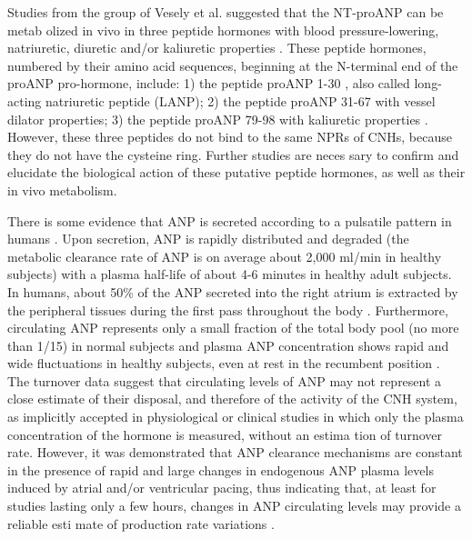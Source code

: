 \documentclass[14pt,a4paper,onecolumn]{extarticle}
\begin{document}
Studies from the group of Vesely et al. suggested that the NT-proANP can be metab olized in vivo in three peptide hormones with blood pressure-lowering, natriuretic, diuretic and/or kaliuretic properties \citep{100}. These peptide hormones, numbered by their amino acid sequences, beginning at the N-terminal end of the proANP pro-hormone, include: 1) the peptide proANP 1-30 , also called long-acting natriuretic peptide (LANP); 2) the peptide proANP 31-67 with vessel dilator properties; 3) the peptide proANP 79-98 with kaliuretic properties \citep{98}. However, these three peptides do not bind to the same NPRs of CNHs, because they do not have the cysteine ring. Further studies are neces sary to confirm and elucidate the biological action of these putative peptide hormones, as well as their in vivo metabolism.

There is some evidence that ANP is secreted according to a pulsatile pattern in humans \citep{193} \citep{194} \citep{195} \citep{196} \citep{197}. Upon secretion, ANP is rapidly distributed and degraded (the metabolic clearance rate of ANP is on average about 2,000 ml/min in healthy subjects) with a plasma half-life of about 4-6 minutes in healthy adult subjects. In humans, about 50\% of the ANP secreted into the right atrium is extracted by the peripheral tissues during the first pass throughout the body \citep{198} \citep{199} \citep{200} \citep{201}. Furthermore, circulating ANP represents only a small fraction of the total body pool (no more than 1/15) in normal subjects and plasma ANP concentration shows rapid and wide fluctuations in healthy subjects, even at rest in the recumbent position \citep{198} \citep{199} \citep{200} \citep{201}. The turnover data suggest that circulating levels of ANP may not represent a close estimate of their disposal, and therefore of the activity of the CNH system, as implicitly accepted in physiological or clinical studies in which only the plasma concentration of the hormone is measured, without an estima tion of turnover rate. However, it was demonstrated that ANP clearance mechanisms are constant in the presence of rapid and large changes in endogenous ANP plasma levels induced by atrial and/or ventricular pacing, thus indicating that, at least for studies lasting only a few hours, changes in ANP circulating levels may provide a reliable esti mate of production rate variations \citep{201}.
\end{document}

